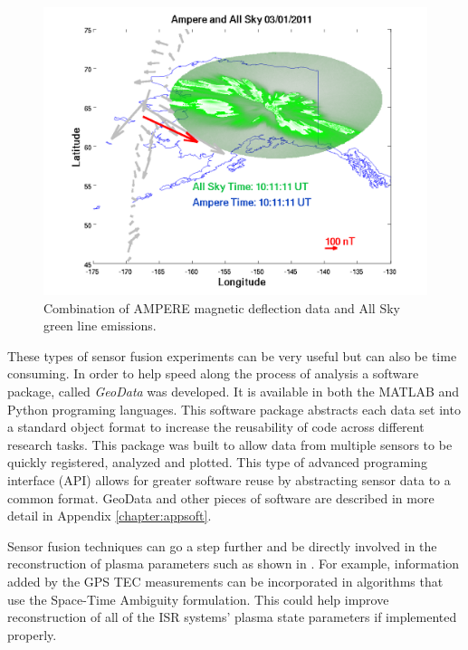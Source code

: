 \begin{figure}[h!]
\centering
\includegraphics[width=6.0in]{ampandallsky214}
\caption{Combination of AMPERE magnetic deflection data and All Sky green line emissions. }
\label{fig:swflowch}
\end{figure}

These types of sensor fusion experiments can be very useful but can also be time consuming. In order to help speed along the process of analysis a software package, called \textit{GeoData} was developed. It is available in both the MATLAB \citep{john_swoboda_2016_154536} 
and Python \citep{john_swoboda_2016_154533} programing languages. This software package abstracts each data set into a standard object format to increase the reusability of code across different research tasks. This package was built to allow data from multiple sensors to be quickly registered, analyzed and plotted. This type of advanced programing interface (API) allows for greater software reuse by abstracting sensor data to a common format. GeoData and other pieces of software are described in more detail in Appendix \ref{chapter:appsoft}.

Sensor fusion techniques can go a step further and be directly involved in the reconstruction of plasma parameters such as shown in \citet{Semeter:2016gm}. For example, information added by the GPS TEC measurements can be incorporated in algorithms that use the Space-Time Ambiguity formulation. This could help improve reconstruction of all of the ISR systems' plasma state parameters if implemented properly.
